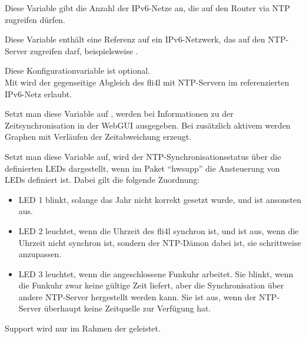 \begin{description}

  Diese Variable gibt die Anzahl der IPv6-Netze an, die auf den Router via NTP
  zugreifen dürfen.


  Diese Variable enthält eine Referenz auf ein IPv6-Netzwerk, das auf den
  NTP-Server zugreifen darf, beispielsweise .


  Diese Konfigurationvariable ist optional.\\
  Mit  wird der gegenseitige Abgleich des fli4l mit NTP-Servern
  im referenzierten IPv6-Netz erlaubt.


  Setzt man diese Variable auf , werden bei 
  Informationen zu der Zeitsynchronisation in der WebGUI
  ausgegeben. Bei zusätzlich aktivem  werden Graphen mit
  Verläufen der Zeitabweichung erzeugt.
  

  Setzt man diese Variable auf, wird der NTP-Syn\-chronisationsstatus
  über die definierten LEDs dargestellt, wenn im Paket ``hwsupp'' die
  Ansteuerung von LEDs definiert ist. Dabei gilt die folgende Zuordnung:
  \begin{itemize}
  \item LED 1 blinkt, solange das Jahr nicht korrekt gesetzt wurde, und ist
        ansonsten aus.
  \item LED 2 leuchtet, wenn die Uhrzeit des fli4l synchron ist, und ist aus,
        wenn die Uhrzeit nicht synchron ist, sondern der NTP-Dämon dabei ist,
        sie schrittweise anzupassen.
  \item LED 3 leuchtet, wenn die angeschlossene Funkuhr arbeitet. Sie blinkt,
        wenn die Funkuhr zwar keine gültige Zeit liefert, aber die
        Synchronisation über andere NTP-Server hergestellt werden kann. Sie
        ist aus, wenn der NTP-Server überhaupt keine Zeitquelle zur Verfügung
        hat.
  \end{itemize}

\end{description}
  
Support wird nur im Rahmen der 
geleistet. 

